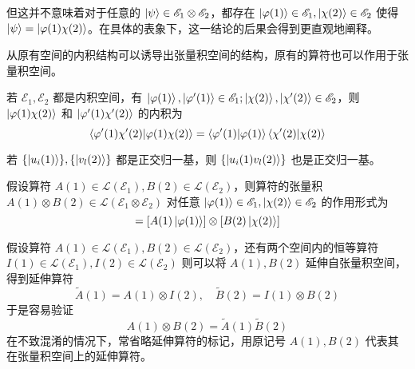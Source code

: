 \documentclass[cn,10pt,math=newtx,citestyle=gb7714-2015,bibstyle=gb7714-2015]{elegantbook}
\def\ms{\mathscr}
\def\mc{\mathcal}
\def\vphi{\varphi}
\def\ox{\otimes}
\def\td{\tilde}
\begin{document}
\begin{remark}
但这并不意味着对于任意的 $\ket{\psi}\in\ms E_1\ox\ms E_2$，都存在 $\ket{\vphi(1)}\in\ms E_1,\ket{\chi(2)}\in\ms E_2$ 使得 $\ket{\psi} = \ket{\vphi(1)\chi(2)}$。在具体的表象下，这一结论的后果会得到更直观地阐释。
\end{remark}

从原有空间的内积结构可以诱导出张量积空间的结构，原有的算符也可以作用于张量积空间。
\begin{definition}[张量积空间中的内积]
    若 $\ms E_1,\ms E_2$ 都是内积空间，有 $\ket{\vphi(1)},\ket{\vphi'(1)}\in\ms E_1;\ket{\chi(2)},\ket{\chi'(2)}\in\ms E_2$，则 $\ket{\vphi(1)\chi(2)}$ 和 $\ket{\vphi'(1)\chi'(2)}$ 的内积为
    \begin{equation}
        \braket{\vphi'(1)\chi'(2)|\vphi(1)\chi(2)} = \braket{\vphi'(1)|\vphi(1)}\braket{\chi'(2)|\chi(2)}
    \end{equation}
\end{definition}

\begin{corollary}[张量积空间的正交归一基]
    若 $\{\ket{u_i(1)}\},\{\ket{v_l(2)}\}$ 都是正交归一基，则 $\{\ket{u_i(1)v_l(2)}\}$ 也是正交归一基。
\end{corollary}

\begin{definition}[算符的张量积]
    假设算符 $A(1)\in\mc L(\ms E_1),B(2)\in\mc L(\ms E_2)$，则算符的张量积 $A(1)\ox B(2)\in \mc L(\ms E_1\ox \ms E_2)$ 对任意 $\ket{\vphi(1)}\in\ms E_1,\ket{\chi(2)}\in\ms E_2$ 的作用形式为
    \begin{equation}
        [A(1)\ox B(2)][\ket{\vphi(1)}\ox\ket{\chi(2)}] = [A(1)\ket{\vphi(1)}]\ox[B(2)\ket{\chi(2)}]
    \end{equation}
\end{definition}
\begin{definition}[延伸算符]
    假设算符 $A(1)\in\mc L(\ms E_1),B(2)\in\mc L(\ms E_2)$，还有两个空间内的恒等算符 $I(1)\in\mc L(\ms E_1),I(2)\in\mc L(\ms E_2)$ 则可以将 $A(1),B(2)$ 延伸自张量积空间，得到延伸算符 
    \begin{equation}
        \td A(1) = A(1)\ox I(2),\quad \td B(2) = I(1)\ox B(2)
    \end{equation}
    于是容易验证
    \begin{equation}
        A(1)\ox B(2) = \td A(1)\td B(2)
    \end{equation}
    在不致混淆的情况下，常省略延伸算符的标记，用原记号 $A(1),B(2)$ 代表其在张量积空间上的延伸算符。
\end{definition}
\end{document}
